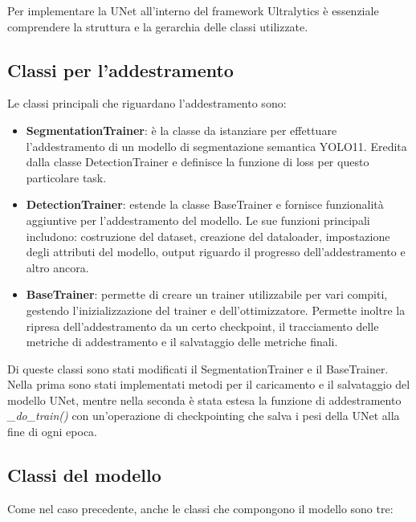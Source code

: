 \documentclass[12pt]{report}
\begin{document}
Per implementare la UNet all'interno del framework Ultralytics è essenziale comprendere la struttura e la gerarchia delle classi utilizzate.

\subsection{Classi per l'addestramento}
\label{sec:classi_per_addestramento}

Le classi principali che riguardano l'addestramento sono:

\begin{itemize}
	\item \textbf{SegmentationTrainer}: è la classe da istanziare per effettuare l'addestramento di un modello di segmentazione semantica YOLO11. Eredita dalla classe DetectionTrainer e definisce la funzione di loss per questo particolare task.
	
	\item \textbf{DetectionTrainer}: estende la classe BaseTrainer e fornisce funzionalità aggiuntive per l'addestramento del modello. Le sue funzioni principali includono: costruzione del dataset, creazione del dataloader, impostazione degli attributi del modello, output riguardo il progresso dell'addestramento e altro ancora.
	
	\item \textbf{BaseTrainer}: permette di creare un trainer utilizzabile per vari compiti, gestendo l'inizializzazione del trainer e dell'ottimizzatore. Permette inoltre la ripresa dell'addestramento da un certo checkpoint, il tracciamento delle metriche di addestramento e il salvataggio delle metriche finali.
\end{itemize}

Di queste classi sono stati modificati il SegmentationTrainer e il BaseTrainer. Nella prima sono stati implementati metodi per il caricamento e il salvataggio del modello UNet, mentre nella seconda è stata estesa la funzione di addestramento \textit{\_do\_train()} con un'operazione di checkpointing che salva i pesi della UNet alla fine di ogni epoca.

\subsection{Classi del modello}
\label{sec:classi_del_modello}

Come nel caso precedente, anche le classi che compongono il modello sono tre:
\end{document}
